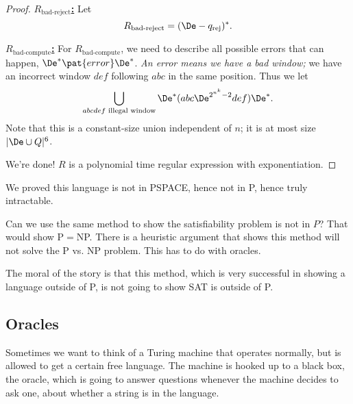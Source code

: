 \begin{proof}

\noindent
\ul{\textbf{$R_{\text{bad-reject}}$:}}
Let
\[
R_{\text{bad-reject}}=(\De-q_{\text{rej}})^*.
\]

\noindent
\ul{\textbf{$R_{\text{bad-compute}}$:}}
For $R_{\text{bad-compute}}$, we need to describe all possible errors that can happen, $\De^*\pat{error}\De^*$. {\it An error means we have a bad window;} we have an incorrect window $def$ following $abc$ in the same position. Thus we let
\[
\bigcup_{abcdef\text{ illegal window}}
\De^*(abc\De^{2^{n^k}-2} def) \De^*.
\]
Note that this is a constant-size union independent of $n$; it is at most size $|\De\cup Q|^6$. 

We're done! $R$ is a polynomial time regular expression with exponentiation.
\end{proof}
We proved this language is not in PSPACE, hence not in P, hence truly intractable.

Can we use the same method to show the satisfiability problem is  not in $P$? That would show P$=$NP. There is a heuristic argument that shows this method will not solve the P vs. NP problem. This has to do with oracles.

The moral of the story is that this method, which is very successful in showing a language outside of P, is not going to show SAT is outside of P.
\subsection{Oracles}
Sometimes we want to think of a Turing machine that operates normally, but is allowed to get a certain free language. The machine is hooked up to a black box, the oracle, which is going to answer questions whenever the machine decides to ask one, about whether a string is in the language. 


